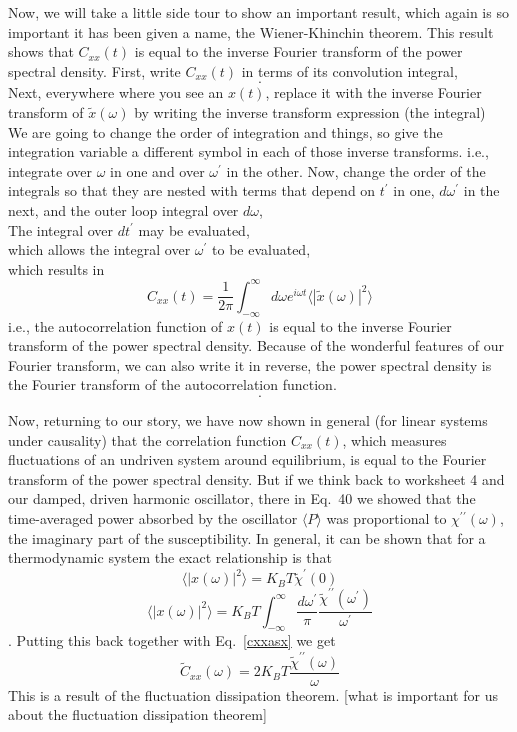 \documentclass[]{revtex4}
\newcommand{\sm}[1]{{\[#1\]}}
\begin{document}
Now, we will take a little side tour to show an important result, which again is so important it has been given a name,
the Wiener-Khinchin theorem.  This result shows that $C_{xx}(t)$ is equal to the inverse Fourier transform of the
power spectral density.  First, write $C_{xx}(t)$ in terms of its convolution integral,
\sm{.}
Next, everywhere where you see an $x(t)$, replace it with the inverse Fourier transform of $\tilde{x}(\omega)$ by writing
the inverse transform expression (the integral)
\sm{}
We are going to change the order of integration and things, so give the integration variable a different symbol in each of
those inverse transforms.  i.e., integrate over $\omega$ in one and over $\omega^\prime$ in the other. Now,
change the order of the integrals so that they are nested with terms that depend on $t^\prime$ in one, $d\omega^\prime$ in the
next, and the outer loop integral over $d\omega$,
\sm{}
The integral over $dt^\prime$ may be evaluated,
\sm{}
which allows the integral over $\omega^\prime$ to be evaluated,
\sm{}
which results in
\[C_{xx}(t) = \frac{1}{2\pi}\int_{-\infty}^{\infty}d\omega e^{i\omega t}\langle|\tilde{x}(\omega)|^2\rangle\label{cxxasx}\]
i.e., the autocorrelation function of $x(t)$ is equal to the inverse Fourier transform of the power spectral density.
Because of the wonderful features of our Fourier transform, we can also write it in reverse, the power
spectral density is the Fourier transform of the autocorrelation function.
\sm{.}

Now, returning to our story, we have now shown in general (for linear systems under causality) that the correlation
function $C_{xx}(t)$, which measures fluctuations of an undriven system around equilibrium, is equal to the
Fourier transform of the power spectral density.  But if we think back to worksheet 4 and our damped, driven harmonic
oscillator, there in Eq.~40 we showed that the time-averaged power absorbed by the oscillator $\langle P\rangle$
was proportional to $\chi^{\prime\prime}(\omega)$, the imaginary part of the susceptibility.  In general,
it can be shown that for a thermodynamic system the exact relationship is that
\[\langle |x(\omega)|^2\rangle = K_BT\tilde{\chi}^\prime(0)\]
\[\langle |x(\omega)|^2\rangle = K_BT\int_{-\infty}^{\infty}\frac{d\omega^\prime}{\pi}\frac{\tilde{\chi}^{\prime\prime}(\omega^\prime)}{\omega^\prime}\].
Putting this back together with Eq.~\ref{cxxasx} we get
\[\tilde{C}_{xx}(\omega)=2K_BT\frac{\tilde{\chi}^{\prime\prime}(\omega)}{\omega}\]
This is a result of the fluctuation dissipation theorem. [what is important for us about the fluctuation dissipation theorem]

\end{document}
